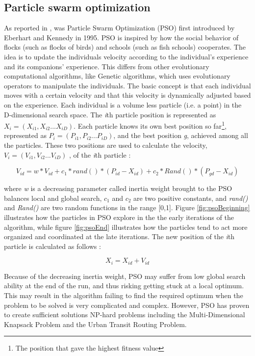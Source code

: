 \subsection{Particle swarm optimization}
\label{subsec:pso}
As reported in \citet{shi99}, was Particle Swarm Optimization (PSO) first introduced by Eberhart and Kennedy in 1995. PSO is inspired by how the social behavior of flocks (such as flocks of birds) and schools (such as fish schools) cooperates. The idea is to update the individuals velocity according to the individual's experience and its companions' experience. This differs from other evolutionary computational algorithms, like Genetic algorithms, which uses evolutionary operators to manipulate the individuals. The basic concept is that each individual moves with a certain velocity and that this velocity is dynamically adjusted based on the experience. Each individual is a volume less particle (i.e. a point) in the D-dimensional search space. The \textit{i}th particle position is represented as $X_i = (X_{i1},X_{i2}...X_{iD})$. Each particle knows its own best position so far\footnote{The position that gave the highest fitness value}, represented as $P_i = (P_{i1},P_{i2}...P_{iD})$, and the best position \textit{g}, achieved among all the particles. These two positions are used to calculate the velocity, $V_i = (V_{i1},V_{i2}...V_{iD})$ ,  of the \textit{i}th particle \citep{shi99}: 

$$V_{id} = w * V_{id} + c_1 * rand() * (P_{id}-X_{id}) + c_2 * Rand() * (P_{gd}-X_{id})$$

where \textit{w} is a decreasing parameter called inertia weight brought to the PSO balances local and global search, $c_1$ and $c_2$ are two positive constants, and \textit{rand()} and \textit{Rand()} are two random functions in the range [0,1]. Figure \ref{fig:psoBeginning} illustrates how the particles in PSO explore in the the early iterations of the algorithm, while figure \ref{fig:psoEnd} illustrates how the particles tend to act more organized and coordinated at the late iterations. The new position of the \textit{i}th particle is calculated as follows \cite{shi99}:

$$X_i = X_{id} + V_{id}$$

Because of the decreasing inertia weight, PSO may suffer from low global search ability at the end of the run, and thus risking getting stuck at a local optimum. This may result in the algorithm failing to find the required optimum when the problem to be solved is very complicated and complex\citep{shi99}. However, PSO has proven to create sufficient solutions NP-hard problems including the Multi-Dimensional Knapsack Problem\citep{wan09} and the Urban Transit Routing Problem\citep{kechagiopoulos14}. 

